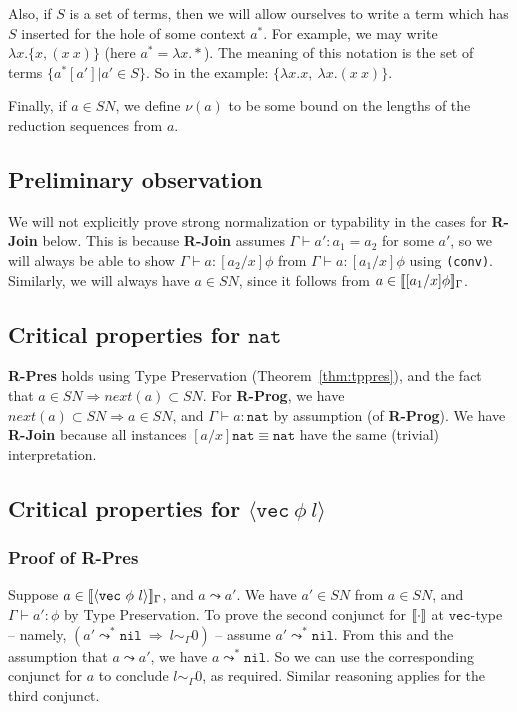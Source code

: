 \documentclass[copyright]{eptcs}
\newcommand{\To}{\Rightarrow}
\newcommand{\next}[0]{\textit{next}}
\newcommand{\SN}[0]{\textit{SN}}
\newcommand{\vc}[0]{\texttt{vec}}
\newcommand{\nat}[0]{\texttt{nat}}
\newcommand{\nil}[0]{\texttt{nil}}
\newcommand{\interp}[1]{[\negthinspace[#1]\negthinspace]}
\begin{document}
Also, if $S$ is a set of terms, then we will allow ourselves to write
a term which has $S$ inserted for the hole of some context $a^*$.  For
example, we may write $\lambda x. \{ x, (x\ x) \}$ (here $a^* =
\lambda x.*$).  The meaning of this notation is the set of terms
$\{a^*[a'] | a' \in S\}$.  So in the example: $\{ \lambda
x.x,\ \lambda x.(x\ x) \}$.  

Finally, if $a\in\SN$, we define $\nu(a)$ to be some bound on the
lengths of the reduction sequences from $a$.

\subsection{Preliminary observation}

We will not explicitly prove strong normalization or typability in the
cases for \textbf{R-Join} below.  This is because \textbf{R-Join}
assumes $\Gamma\vdash a':a_1 = a_2$ for some $a'$, so we will always
be able to show $\Gamma\vdash a:[a_2/x]\phi$ from $\Gamma\vdash
a:[a_1/x]\phi$ using \texttt{(conv)}.  Similarly, we will always have
$a\in\SN$, since it follows from $a\in\interp{[a_1/x]\phi}_\Gamma$.

\subsection{Critical properties for $\nat$}

\textbf{R-Pres} holds using Type Preservation
(Theorem~\ref{thm:tppres}), and the fact that $a\in\SN \To
\next(a)\subset\SN$.  For \textbf{R-Prog}, we have $\next(a)\subset\SN
\To a\in\SN$, and $\Gamma\vdash a:\nat$ by assumption (of
\textbf{R-Prog}). We have \textbf{R-Join} because all instances
$[a/x]\nat \equiv \nat$ have the same (trivial) interpretation.

\subsection{Critical properties for $\langle\vc\ \phi\ l\rangle$}

\subsubsection{Proof of \textbf{R-Pres}}

Suppose $a\in\interp{\langle\vc\ \phi\ l\rangle}_\Gamma$, and
$a\leadsto a'$.  We have $a'\in\SN$ from $a\in\SN$, and $\Gamma\vdash
a':\phi$ by Type Preservation.  To prove the second conjunct for
$\interp{\cdot}$ at $\vc$-type -- namely, $(a'\leadsto^* \nil\ \To\ l
\sim_\Gamma 0)$ -- assume $a'\leadsto^* \nil$.  From this and the
assumption that $a\leadsto a'$, we have $a\leadsto^* \nil$.  So we can
use the corresponding conjunct for $a$ to conclude $l\sim_\Gamma 0$,
as required.  Similar reasoning applies for the third conjunct.
\end{document}
